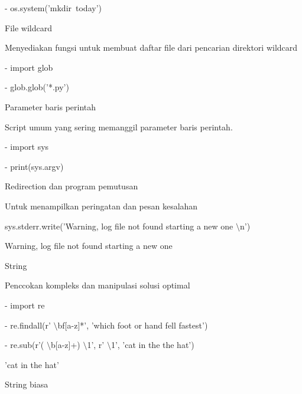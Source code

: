 \vspace{12pt}
\noindent 
- os.system('mkdir~today')~   \par
{} \par
\vspace{12pt}
\noindent 
File wildcard \par
\noindent 
Menyediakan fungsi untuk membuat daftar file dari pencarian direktori wildcard \par
\vspace{12pt}
\noindent 
- import glob \par
\vspace{12pt}
\noindent 
- glob.glob('*.py') \par
{} \par
\noindent 
Parameter baris perintah  \par
\noindent 
Script umum yang sering memanggil parameter baris perintah.  \par
\noindent 
- import sys \par
\noindent 
- print(sys.argv) \par
{} \par
\vspace{12pt}
\noindent 
Redirection dan program pemutusan \par
\noindent 
Untuk menampilkan peringatan dan pesan kesalahan \par
\noindent 
 sys.stderr.write('Warning, log file not found starting a new one $  \setminus  $n') \par
\noindent 
Warning, log file not found starting a new one \par
\noindent 
String \par
\noindent 
Penccokan kompleks dan manipulasi solusi optimal \par
\noindent 
- import re \par
\noindent 
- re.findall(r' $  \setminus  $bf[a-z]*', 'which foot or hand fell fastest') \par
{} \par
\vspace{12pt}
\noindent 
- re.sub(r'( $  \setminus  $b[a-z]+)  $  \setminus  $1', r' $  \setminus  $1', 'cat in the the hat') \par
\noindent 
'cat in the hat' \par
\vspace{12pt}
\noindent 
String biasa \par
\noindent 

